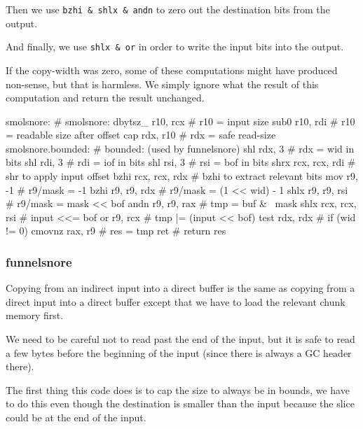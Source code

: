 Then we use \lstinline|bzhi & shlx & andn| to zero out the destination
bits from the output.

And finally, we use \lstinline|shlx & or| in order to write the input
bits into the output.

If the copy-width was zero, some of these computations might have produced
non-sense, but that is harmless.  We simply ignore what the result of
this computation and return the result unchanged.

\begin{asm}
smolsnore:                                  # smolsnore:
	dbytsz_	r10, rcx                    #   r10 = input size
	sub0	r10, rdi                    #   r10 = readable size after offset
	cap	rdx, r10                    #   rdx = safe read-size
smolsnore.bounded:                          # bounded: (used by funnelsnore)
	shl	rdx, 3                      #   rdx = wid in bits
	shl	rdi, 3                      #   rdi = iof in bits
	shl	rsi, 3                      #   rsi = bof in bits
	shrx	rcx, rcx, rdi               #   shr to apply input offset
	bzhi	rcx, rcx, rdx               #   bzhi to extract relevant bits
	mov	r9, -1                      #   r9/mask = -1
	bzhi	r9, r9, rdx                 #   r9/mask = (1 << wid) - 1
	shlx	r9, r9, rsi                 #   r9/mask = mask << bof
	andn	r9, r9, rax                 #   tmp = buf & ~mask
	shlx	rcx, rcx, rsi               #   input <<= bof
	or	r9, rcx                     #   tmp |= (input << bof)
	test	rdx, rdx                    #   if (wid != 0)
	cmovnz	rax, r9                     #     res = tmp
	ret                                 #   return res
\end{asm}

\subsubsection{funnelsnore}

Copying from an indirect input into a direct buffer is the same as
copying from a direct input into a direct buffer except that we have to
load the relevant chunk memory first.

We need to be careful not to read past the end of the input, but it is
safe to read a few bytes before the beginning of the input (since there
is always a GC header there).

The first thing this code does is to cap the size to always be in bounds,
we have to do this even though the destination is smaller than the input
because the slice could be at the end of the input.

